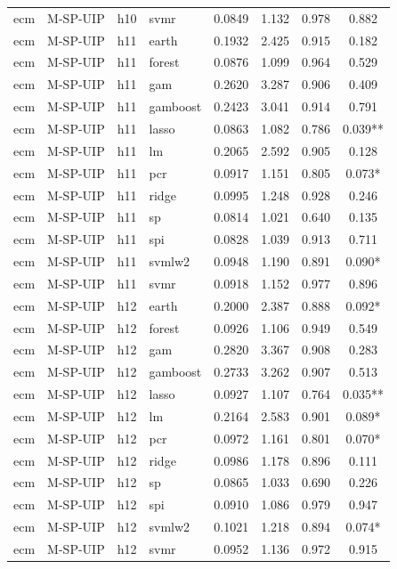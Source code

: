 \begin{ThreePartTable}
\begin{longtable}[t]{llclcccc}
ecm & M-SP-UIP & h10 & svmr & 0.0849 & 1.132 & 0.978 & 0.882\\
\addlinespace
ecm & M-SP-UIP & h11 & earth & 0.1932 & 2.425 & 0.915 & 0.182\\
ecm & M-SP-UIP & h11 & forest & 0.0876 & 1.099 & 0.964 & 0.529\\
ecm & M-SP-UIP & h11 & gam & 0.2620 & 3.287 & 0.906 & 0.409\\
ecm & M-SP-UIP & h11 & gamboost & 0.2423 & 3.041 & 0.914 & 0.791\\
ecm & M-SP-UIP & h11 & lasso & 0.0863 & 1.082 & 0.786 & 0.039**\\
ecm & M-SP-UIP & h11 & lm & 0.2065 & 2.592 & 0.905 & 0.128\\
ecm & M-SP-UIP & h11 & pcr & 0.0917 & 1.151 & 0.805 & 0.073*\\
ecm & M-SP-UIP & h11 & ridge & 0.0995 & 1.248 & 0.928 & 0.246\\
ecm & M-SP-UIP & h11 & sp & 0.0814 & 1.021 & 0.640 & 0.135\\
ecm & M-SP-UIP & h11 & spi & 0.0828 & 1.039 & 0.913 & 0.711\\
ecm & M-SP-UIP & h11 & svmlw2 & 0.0948 & 1.190 & 0.891 & 0.090*\\
ecm & M-SP-UIP & h11 & svmr & 0.0918 & 1.152 & 0.977 & 0.896\\
\addlinespace
ecm & M-SP-UIP & h12 & earth & 0.2000 & 2.387 & 0.888 & 0.092*\\
ecm & M-SP-UIP & h12 & forest & 0.0926 & 1.106 & 0.949 & 0.549\\
ecm & M-SP-UIP & h12 & gam & 0.2820 & 3.367 & 0.908 & 0.283\\
ecm & M-SP-UIP & h12 & gamboost & 0.2733 & 3.262 & 0.907 & 0.513\\
ecm & M-SP-UIP & h12 & lasso & 0.0927 & 1.107 & 0.764 & 0.035**\\
ecm & M-SP-UIP & h12 & lm & 0.2164 & 2.583 & 0.901 & 0.089*\\
ecm & M-SP-UIP & h12 & pcr & 0.0972 & 1.161 & 0.801 & 0.070*\\
ecm & M-SP-UIP & h12 & ridge & 0.0986 & 1.178 & 0.896 & 0.111\\
ecm & M-SP-UIP & h12 & sp & 0.0865 & 1.033 & 0.690 & 0.226\\
ecm & M-SP-UIP & h12 & spi & 0.0910 & 1.086 & 0.979 & 0.947\\
ecm & M-SP-UIP & h12 & svmlw2 & 0.1021 & 1.218 & 0.894 & 0.074*\\
ecm & M-SP-UIP & h12 & svmr & 0.0952 & 1.136 & 0.972 & 0.915\\

\end{longtable}
\end{ThreePartTable}
